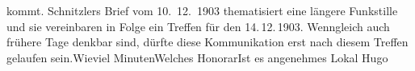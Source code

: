 \begin{ledgroupsized}[t]{13cm}
{{{                     kommt. Schnitzlers Brief vom 10. 12. 1903 thematisiert eine längere Funkstille und
                  sie vereinbaren in Folge ein Treffen für den 14. 12. 1903. Wenngleich auch frühere Tage denkbar sind, dürfte diese
                  Kommunikation erst nach diesem Treffen gelaufen sein.}}}\label{K_L01330-1h}\hspace*{1em}Wieviel Minuten\hspace*{1em}Welches Honorar\hspace*{1em}Ist es angenehmes Lokal\pend
           \pstart \spacefill\mbox{Hugo}\pend{}
         
         \endnumbering{}\end{ledgroupsized}  \newcommand{\dateiname}{L01330}\newcommand{\titel}{Hugo von Hofmannsthal an Arthur Schnitzler, [zwischen 14. und 23. 12. 1903?]}\newcommand{\editorInnen}{Martin Anton Müller und Gerd-Hermann Susen}
      